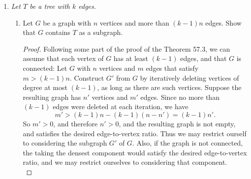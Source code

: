 \documentclass{article}
\begin{document}
\begin{enumerate}
\begin{enumerate}
\begin{proof}
          Then
          \begin{align*}
            t(G)/\binom{n}{3} &\geq1 -\frac{\frac{1}{8}n(n-1)^2}
              {\binom{n}{3}}\\
            &=1 -\frac{\frac{1}{8}n(n-1)^2} {\frac{1}{6}n(n-1)(n-2)}\\
            &=\frac{1}{4} -\frac{3}{4(n-2)},\\
          \end{align*}
          which tends to $1/4$ as $n$ tends to infinity. In particular,
          given $\epsilon>0$, choose $n$ large enough such that
          $\frac{3}{4(n-2)}<\epsilon$; or equivalently choose
          $n>\frac{3}{4\epsilon}+2$. Then we will have
          \begin{align*}
            t(G)/\binom{n}{3} &\geq\frac{1}{4} -\epsilon\\
          \end{align*}
          as desired.
        \end{proof}
    \end{enumerate}

  \item \it Let $T$ be a tree with $k$ edges.
    \begin{enumerate}
      \item Let $G$ be a graph with $n$ vertices and more than $(k-1)n$
        edges. Show that $G$ contains $T$ as a subgraph.

        \begin{proof}
          Following some part of the proof of the Theorem 57.3, we can
          assume that each vertex of $G$ has at least $(k-1)$ edges, and
          that $G$ is connected: Let $G$ with $n$ vertices and $m$ edges
          that satisfy $m>(k-1)n$. Construct $G'$ from $G$ by iteratively
          deleting vertices of degree at most $(k-1)$, as long as there are
          such vertices. Suppose the resulting graph has $n'$ vertices and
          $m'$ edges. Since no more than $(k-1)$ edges were deleted at each
          iteration, we have
          \[m' >(k-1)n-(k-1)(n-n') =(k-1)n'.\]
          So $m'>0$, and therefore $n'>0$, and the resulting graph is not
          empty, and satisfies the desired edge-to-vertex ratio. Thus we
          may restrict ourself to considering the subgraph $G'$ of $G$.
          Also, if the graph is not connected, the taking the densest
          component would satisfy the desired edge-to-vertex ratio, and we
          may restrict ourselves to considering that component. \\


\end{proof}
\end{enumerate}
\end{enumerate}
\end{document}
